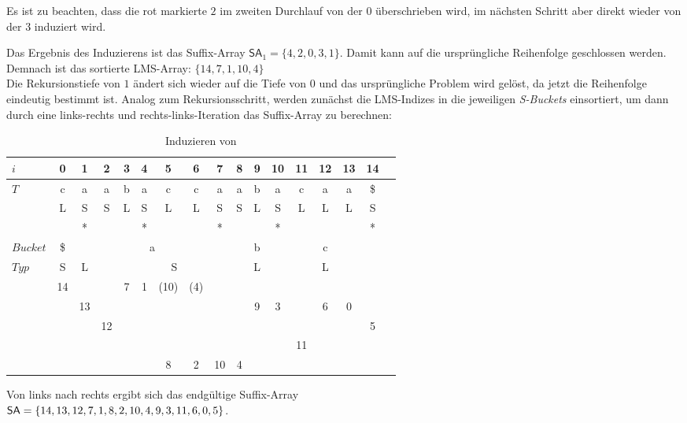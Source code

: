 \noindent Es ist zu beachten, dass die rot markierte $2$ im zweiten Durchlauf von der $0$ überschrieben wird, im nächsten Schritt aber direkt wieder von der $3$ induziert wird.

Das Ergebnis des Induzierens ist das Suffix-Array $\mathsf{SA}_1 = \{4, 2, 0, 3, 1\}$. Damit kann auf die ursprüngliche Reihenfolge geschlossen werden. Demnach ist das sortierte LMS-Array: $\{14, 7, 1, 10, 4\}$ \\
Die Rekursionstiefe von $1$ ändert sich wieder auf die Tiefe von $0$ und das ursprüngliche Problem wird gelöst, da jetzt die Reihenfolge eindeutig bestimmt ist. Analog zum Rekursionsschritt, werden zunächst die LMS-Indizes in die jeweiligen \textit{S-Buckets} einsortiert, um dann durch eine links-rechts und rechts-links-Iteration das Suffix-Array \sa zu berechnen:

\begin{table}[H]
\centering
\begin{adjustbox}{width=1\textwidth}
  \begin{tabular}{ | l | c | c | c | c | c | c | c | c | c | c | c | c | c | c | c | c | }
    \hline
        $i$ & 0 & 1 & 2 & 3 & 4 & 5 & 6 & 7 & 8 & 9 & 10 & 11 & 12 & 13 & 14 \\ \hline
        $T$ & c & a & a & b & a & c & c & a & a & b & a & c & a & a & \$ \\ \hline
            & L & S & S & L & S & L & L & S & S & L & S & L & L & L & S \\ \hline
            &   & * &   &   & * &   &   & * &   &   & * &   &   &   & * \\ \hline
   $Bucket$ &\$ & \multicolumn{7}{c}{a} &   & \multicolumn{1}{c}{b} &   & \multicolumn{3}{c}{c} & \\ \hline
      $Typ$ & S & \multicolumn{1}{c}{L} &   & \multicolumn{5}{c}{S} &   & \multicolumn{1}{c}{L} &    & \multicolumn{3}{c}{L} &\\ \hline
            & 14 & & & 7 & 1 & (10) & (4) & & &  &   & &   &   &  \\ \hline
            & & 13 & & & & & & & & 9 & 3 & & 6 & 0 & \\ \hline
            &  &  & 12 & & & & & & & & & & &  & 5 \\ \hline
            & & & & & &   & & &   &   & & 11 & & & \\ \hline
            & & & & & & 8 & 2 & 10 & 4 &   & &   &   &   & \\
    \hline
  \end{tabular}
  \end{adjustbox}
  \caption{Induzieren von \sa}
\end{table}
\bigskip
\noindent Von links nach rechts ergibt sich das endgültige Suffix-Array \\
$\sa = \{14, 13, 12, 7, 1, 8, 2, 10, 4, 9, 3, 11, 6, 0, 5\}$.

